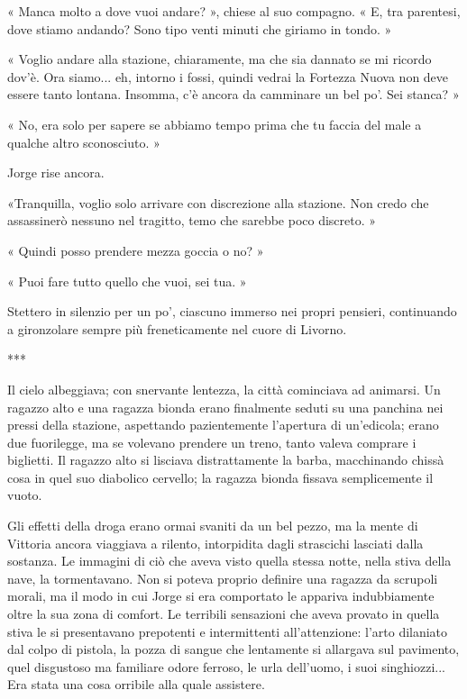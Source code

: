 « Manca molto a dove vuoi andare? », chiese al suo compagno. « E, tra parentesi, dove stiamo andando? Sono tipo venti minuti che giriamo in tondo. »

« Voglio andare alla stazione, chiaramente, ma che sia dannato se mi ricordo dov'è. Ora siamo... eh, intorno i fossi, quindi vedrai la Fortezza Nuova non deve essere tanto lontana. Insomma, c'è ancora da camminare un bel po'. Sei stanca? »

« No, era solo per sapere se abbiamo tempo prima che tu faccia del male a qualche altro sconosciuto. »

Jorge rise ancora.

«Tranquilla, voglio solo arrivare con discrezione alla stazione. Non credo che assassinerò nessuno nel tragitto, temo che sarebbe poco discreto. »

« Quindi posso prendere mezza goccia o no? »

« Puoi fare tutto quello che vuoi, sei tua. »

Stettero in silenzio per un po', ciascuno immerso nei propri pensieri, continuando a gironzolare sempre più freneticamente nel cuore di Livorno.

***

Il cielo albeggiava; con snervante lentezza, la città cominciava ad animarsi. Un ragazzo alto e una ragazza bionda erano finalmente seduti su una panchina nei pressi della stazione, aspettando pazientemente l'apertura di un'edicola; erano due fuorilegge, ma se volevano prendere un treno, tanto valeva comprare i biglietti. Il ragazzo alto si lisciava distrattamente la barba, macchinando chissà cosa in quel suo diabolico cervello; la ragazza bionda fissava semplicemente il vuoto.

Gli effetti della droga erano ormai svaniti da un bel pezzo, ma la mente di Vittoria ancora viaggiava a rilento, intorpidita dagli strascichi lasciati dalla sostanza. Le immagini di ciò che aveva visto quella stessa notte, nella stiva della nave, la tormentavano. Non si poteva proprio definire una ragazza da scrupoli morali, ma il modo in cui Jorge si era comportato le appariva indubbiamente oltre la sua zona di comfort. Le terribili sensazioni che aveva provato in quella stiva le si presentavano prepotenti e intermittenti all'attenzione: l'arto dilaniato dal colpo di pistola, la pozza di sangue che lentamente si allargava sul pavimento, quel disgustoso ma familiare odore ferroso, le urla dell'uomo, i suoi singhiozzi... Era stata una cosa orribile alla quale assistere.


